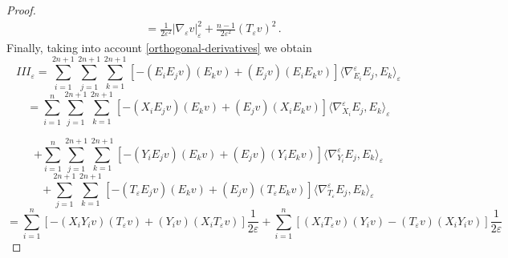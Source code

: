 \documentclass[10pt]{amsart}
\numberwithin{equation}{section}
\theoremstyle{definition}
\begin{document}
\begin{proof}
\begin{equation}
\begin{aligned}
			&=\frac{1}{2\varepsilon^2} |\nabla_\varepsilon v|_\varepsilon^2+ \frac{n-1}{2\varepsilon^2}(T_\varepsilon v)^2 \, .
		\end{aligned}
	\end{equation}
	Finally, taking into account \eqref{orthogonal-derivatives} we obtain
	\begin{equation*}
		III_\varepsilon=\sum_{i=1}^{2n+1} \sum_{j=1}^{2n+1} \sum_{k=1}^{2n+1} \left[ -(E_i E_j v)(E_kv)    +(E_j v) (E_iE_kv) \right] \langle \nabla^\varepsilon_{E_i} E_j ,  E_k \rangle_\varepsilon
	\end{equation*}
	\[ =\sum_{i=1}^n  \sum_{j=1}^{2n+1} \sum_{k=1}^{2n+1} \left[ -(X_i E_j v)(E_kv)    +(E_j v) (X_iE_kv) \right] \langle \nabla^\varepsilon_{X_i} E_j ,  E_k \rangle_\varepsilon \]
	
	\[ +\sum_{i=1}^n  \sum_{j=1}^{2n+1} \sum_{k=1}^{2n+1} \left[ -(Y_i E_j v)(E_kv)    +(E_j v) (Y_iE_kv) \right] \langle \nabla^\varepsilon_{Y_i} E_j ,  E_k \rangle_\varepsilon \]
	\[  + \sum_{j=1}^{2n+1} \sum_{k=1}^{2n+1} \left[ -(T_\varepsilon E_j v)(E_kv)    +(E_j v) (T_\varepsilon E_kv) \right] \langle \nabla^\varepsilon_{T_\varepsilon} E_j ,  E_k \rangle_\varepsilon\]
	\[= \sum_{i=1}^n   \left[ -(X_i Y_i v)(T_\varepsilon v)    +(Y_i v) (X_iT_\varepsilon v) \right] \frac{1}{2\varepsilon} + \sum_{i=1}^n   \left[ (X_i T_\varepsilon v)(Y_iv)    -(T_\varepsilon v) (X_iY_iv) \right] \frac{1}{2\varepsilon} \]
	

\end{proof}
\end{document}
